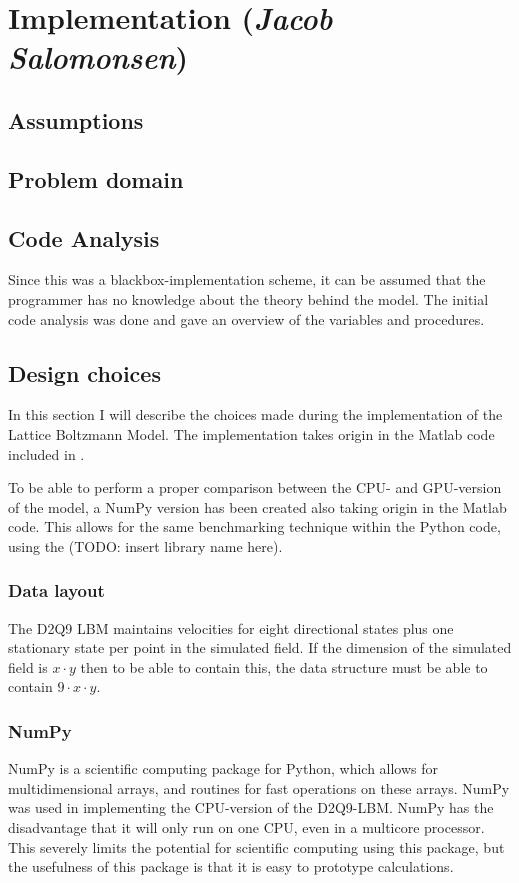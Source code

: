 \section{Implementation (\textit{Jacob Salomonsen})}

\subsection{Assumptions}

\subsection{Problem domain}

\subsection{Code Analysis}
Since this was a blackbox-implementation scheme, it can be assumed that the programmer has no knowledge about the theory behind the model. The initial code analysis was done and gave an overview of the variables and procedures. 

\subsection{Design choices}
In this section I will describe the choices made during the implementation of the Lattice Boltzmann Model. The implementation takes origin in the Matlab code included in .

To be able to perform a proper comparison between the CPU- and GPU-version of the model, a NumPy version has been created also taking origin in the Matlab code. This allows for the same benchmarking technique within the Python code, using the (TODO: insert library name here).

\subsubsection{Data layout}
The D2Q9 LBM maintains velocities for eight directional states plus one stationary state per point in the simulated field. If the dimension of the simulated field is $x \cdot y$ then to be able to contain this, the data structure must be able to contain $9 \cdot x \cdot y$.

\subsubsection{NumPy}
NumPy is a scientific computing package for Python, which allows for multidimensional arrays, and routines for fast operations on these arrays. NumPy was used in implementing the CPU-version of the D2Q9-LBM. NumPy has the disadvantage that it will only run on one CPU, even in a multicore processor. This severely limits the potential for scientific computing using this package, but the usefulness of this package is that it is easy to prototype calculations.

